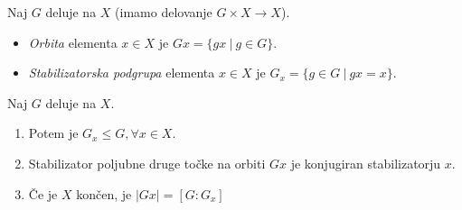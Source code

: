 \begin{defin}
	Naj $G$ deluje na $X$ (imamo delovanje $G \times X \to X$).
	\begin{itemize}
		\item{\emph{Orbita} elementa $x \in X$ je $Gx = \{gx\ |\ g\in G\}$.}
		\item{\emph{Stabilizatorska podgrupa} elementa $x \in X$ je $G_x = \{g \in G\ |\ gx = x\}$.}
	\end{itemize}
\end{defin}

\begin{trditev}
	Naj $G$ deluje na $X$.
	\begin{enumerate}
		\item{Potem je $G_x \leq G, \forall x \in X$.}
		\item{Stabilizator poljubne druge to\v cke na orbiti $Gx$ je konjugiran stabilizatorju $x$.}
		\item{\v Ce je $X$ kon\v cen, je $|Gx| = [G:G_x]$}
	\end{enumerate}
\end{trditev}

